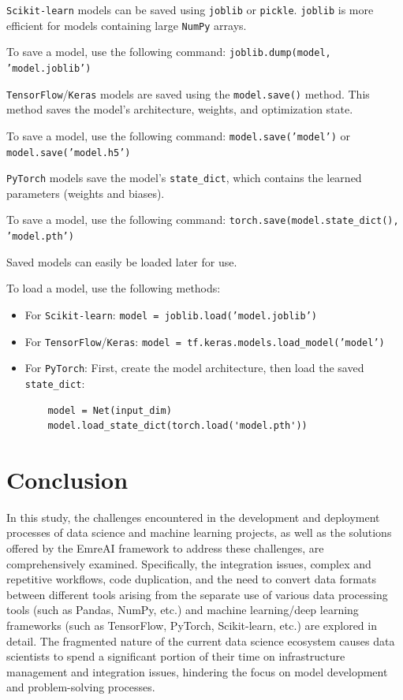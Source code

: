 \documentclass[conference]{IEEEtran}
\begin{document}
\texttt{Scikit-learn} models can be saved using \texttt{joblib} or \texttt{pickle}. \texttt{joblib} is more efficient for models containing large \texttt{NumPy} arrays.

To save a model, use the following command:
\texttt{joblib.dump(model, 'model.joblib')}

\texttt{TensorFlow}/\texttt{Keras} models are saved using the \texttt{model.save()} method. This method saves the model's architecture, weights, and optimization state.

To save a model, use the following command:
\texttt{model.save('model')} or \texttt{model.save('model.h5')}

\texttt{PyTorch} models save the model's \texttt{state\_dict}, which contains the learned parameters (weights and biases).

To save a model, use the following command:
\texttt{torch.save(model.state\_dict(), 'model.pth')}

Saved models can easily be loaded later for use.

To load a model, use the following methods:
\begin{footnotesize}
\begin{itemize}
    \item For \texttt{Scikit-learn}: \texttt{model = joblib.load('model.joblib')}
    \item For \texttt{TensorFlow}/\texttt{Keras}: \texttt{model = tf.keras.models.load\_model('model')}
    \item For \texttt{PyTorch}: First, create the model architecture, then load the saved \texttt{state\_dict}:
    \begin{verbatim}
    model = Net(input_dim)
    model.load_state_dict(torch.load('model.pth'))
    \end{verbatim}
\end{itemize}
\end{footnotesize}

\section{Conclusion}

In this study, the challenges encountered in the development and deployment processes of data science and machine learning projects, as well as the solutions offered by the EmreAI framework to address these challenges, are comprehensively examined. Specifically, the integration issues, complex and repetitive workflows, code duplication, and the need to convert data formats between different tools arising from the separate use of various data processing tools (such as Pandas, NumPy, etc.) and machine learning/deep learning frameworks (such as TensorFlow, PyTorch, Scikit-learn, etc.) are explored in detail. The fragmented nature of the current data science ecosystem causes data scientists to spend a significant portion of their time on infrastructure management and integration issues, hindering the focus on model development and problem-solving processes.
\end{document}
